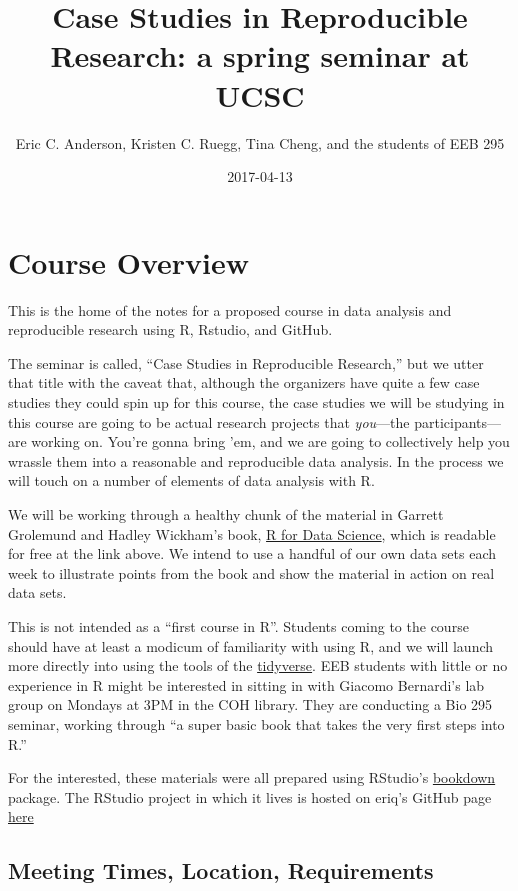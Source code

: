 \documentclass[]{book}
\title{Case Studies in Reproducible Research: a spring seminar at UCSC}
\author{Eric C. Anderson, Kristen C. Ruegg, Tina Cheng, and the students of EEB
295}
\date{2017-04-13}
\theoremstyle{definition}
\theoremstyle{definition}
\theoremstyle{remark}
\begin{document}
\maketitle

{
\setcounter{tocdepth}{1}
\tableofcontents
}
\chapter{Course Overview}\label{course-overview}

This is the home of the notes for a proposed course in data analysis and
reproducible research using R, Rstudio, and GitHub.

The seminar is called, ``Case Studies in Reproducible Research,'' but we
utter that title with the caveat that, although the organizers have
quite a few case studies they could spin up for this course, the case
studies we will be studying in this course are going to be actual
research projects that \emph{you}---the participants---are working on.
You're gonna bring 'em, and we are going to collectively help you
wrassle them into a reasonable and reproducible data analysis. In the
process we will touch on a number of elements of data analysis with R.

We will be working through a healthy chunk of the material in Garrett
Grolemund and Hadley Wickham's book, \href{http://r4ds.had.co.nz/}{R for
Data Science}, which is readable for free at the link above. We intend
to use a handful of our own data sets each week to illustrate points
from the book and show the material in action on real data sets.

This is not intended as a ``first course in R''. Students coming to the
course should have at least a modicum of familiarity with using R, and
we will launch more directly into using the tools of the
\href{http://tidyverse.org/}{tidyverse}. EEB students with little or no
experience in R might be interested in sitting in with Giacomo
Bernardi's lab group on Mondays at 3PM in the COH library. They are
conducting a Bio 295 seminar, working through ``a super basic book that
takes the very first steps into R.''

For the interested, these materials were all prepared using RStudio's
\href{https://bookdown.org/}{bookdown} package. The RStudio project in
which it lives is hosted on eriq's GitHub page
\href{https://github.com/eriqande/rep-res-eeb-2017}{here}

\section{Meeting Times, Location,
Requirements}\label{meeting-times-location-requirements}
\end{document}
